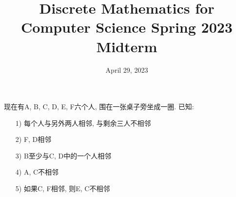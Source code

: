 \documentclass{exam}
\title{Discrete Mathematics for Computer Science Spring 2023\\
       Midterm}
\date{April 29, 2023}
\begin{document}
\maketitle
\begin{questions}
    \question[8]现在有A, B, C, D, E, F六个人, 围在一张桌子旁坐成一圈. 已知: 
    \begin{enumerate}
        \item[1)] 每个人与另外两人相邻, 与剩余三人不相邻
        \item[2)] F, D相邻
        \item[3)] B至少与C, D中的一个人相邻
        \item[4)] A, C不相邻
        \item[5)] 如果C, F相邻, 则E, C不相邻
    \end{enumerate}
\end{questions}
\end{document}

